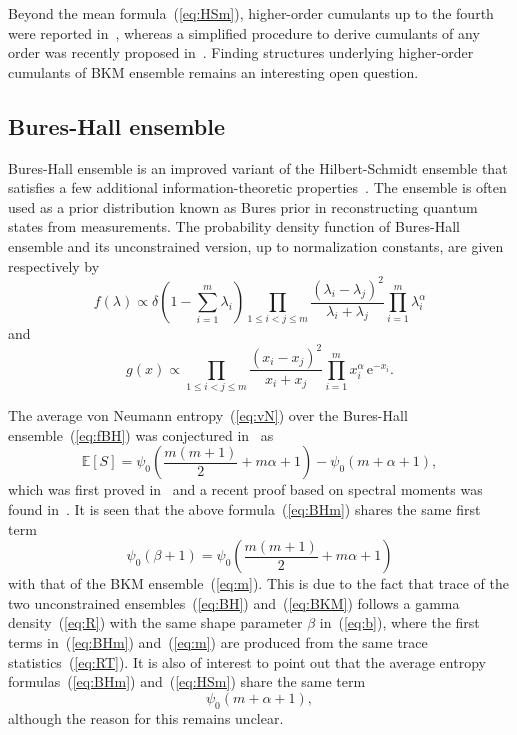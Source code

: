 \documentclass[pdflatex,sn-mathphys-num]{sn-jnl}%
\theoremstyle{thmstyleone}
\newcommand{\ee}{\,\mathrm{e}}
\begin{document}
\begin{appendices}
Beyond the mean formula~(\ref{eq:HSm}), higher-order cumulants up to the fourth were reported in~\cite{VPO16,Wei17,Wei20,HWC21}, whereas a simplified procedure to derive cumulants of any order was recently proposed in~\cite{HW25}. Finding structures underlying higher-order cumulants of BKM ensemble remains an interesting open question.

\subsection{Bures-Hall ensemble}
Bures-Hall ensemble is an improved variant of the Hilbert-Schmidt ensemble that satisfies a few additional information-theoretic properties~\cite{Sommers03}. The ensemble is often used as a prior distribution known as Bures prior in reconstructing quantum states from measurements. The probability density function of Bures-Hall ensemble and its unconstrained version, up to normalization constants, are given respectively by~\cite{Kumar19}
\begin{equation}\label{eq:fBH}
f(\lambda)\propto\delta\left(1-\sum_{i=1}^{m}\lambda_{i}\right)\prod_{1\leq i<j\leq m}\frac{\left(\lambda_{i}-\lambda_{j}\right)^{2}}{\lambda_{i}+\lambda_{j}}\prod_{i=1}^{m}\lambda_{i}^{\alpha}
\end{equation}
and
\begin{equation}\label{eq:BH}
g(x)\propto\prod_{1\leq i<j\leq m}\frac{\left(x_{i}-x_{j}\right)^{2}}{x_{i}+x_{j}}\prod_{i=1}^{m}x_{i}^{\alpha}\ee^{-x_{i}}.
\end{equation}

The average von Neumann entropy~(\ref{eq:vN}) over the Bures-Hall ensemble~(\ref{eq:fBH}) was conjectured in~\cite{Kumar19} as
\begin{equation}\label{eq:BHm}
\mathbb{E}\!\left[S\right]=\psi_{0}\left(\frac{m(m+1)}{2}+m\alpha+1\right)-\psi_{0}\left(m+\alpha+1\right),
\end{equation}
which was first proved in~\cite{Wei20BHA} and a recent proof based on spectral moments was found in~\cite{WHW26}. It is seen that the above formula~(\ref{eq:BHm}) shares the same first term 
\begin{equation}
\psi_{0}(\beta+1)=\psi_{0}\left(\frac{m(m+1)}{2}+m\alpha+1\right)
\end{equation}
with that of the BKM ensemble~(\ref{eq:m}). This is due to the fact that trace of the two unconstrained ensembles~(\ref{eq:BH}) and~(\ref{eq:BKM}) follows a gamma density~(\ref{eq:R}) with the same shape parameter $\beta$ in~(\ref{eq:b}), where the first terms in~(\ref{eq:BHm}) and~(\ref{eq:m}) are produced from the same trace statistics~(\ref{eq:RT}). It is also of interest to point out that the average entropy formulas~(\ref{eq:BHm}) and~(\ref{eq:HSm}) share the same term
\begin{equation}
\psi_{0}\left(m+\alpha+1\right),
\end{equation}
although the reason for this remains unclear.


\end{appendices}
\end{document}
